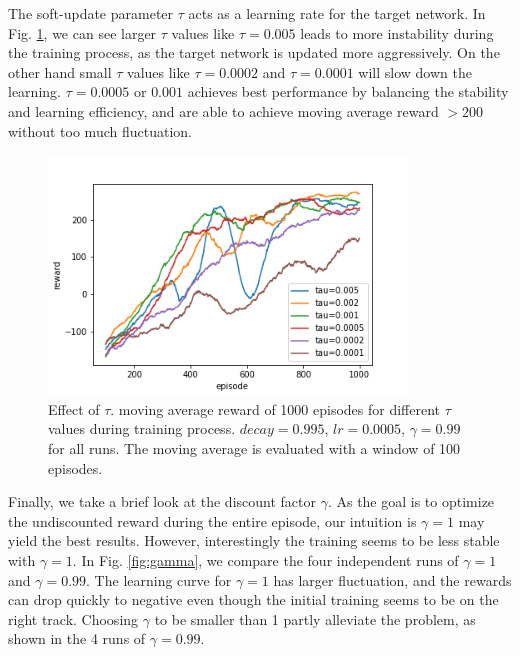 \documentclass[conference]{IEEEtran}
\begin{document}
The soft-update parameter $\tau$ acts as a learning rate for the target network. In Fig. \ref{fig:tau}, we can see larger $\tau$ values like $\tau=0.005$ leads to more instability during the training process, as the target network is updated more aggressively. On the other hand small $\tau$ values like $\tau=0.0002$ and $\tau=0.0001$ will slow down the learning. $\tau=0.0005$ or $0.001$ achieves best performance by balancing the stability and learning efficiency, and are able to achieve moving average reward $> 200$ without too much fluctuation.

\begin{figure}
	\includegraphics[height=2.5in]{figures/tau.png} 
	\caption{Effect of $\tau$. moving average reward of 1000 episodes for different $\tau$ values during training process. $decay=0.995$, $lr=0.0005$, $\gamma=0.99$ for all runs. The moving average is evaluated with a window of 100 episodes.}
	\label{fig:tau}
\end{figure}
	
Finally, we take a brief look at the discount factor $\gamma$. As the goal is to optimize the undiscounted reward during the entire episode, our intuition is $\gamma=1$ may yield the best results. However, interestingly the training seems to be less stable with $\gamma=1$. In Fig. \ref{fig:gamma}, we compare the four independent runs of $\gamma=1$ and $\gamma=0.99$. The learning curve for $\gamma=1$ has larger fluctuation, and the rewards can drop quickly to negative even though the initial training seems to be on the right track. Choosing $\gamma$ to be smaller than 1 partly alleviate the problem, as shown in the 4 runs of $\gamma=0.99$.
\end{document}
